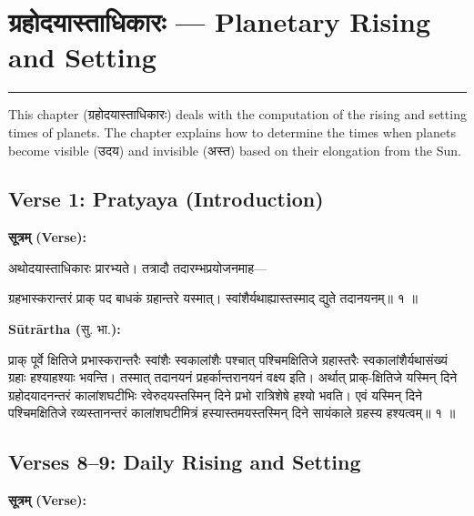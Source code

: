 \documentclass[11pt,a4paper]{article}
\newcommand{\dev}[1]{{\devanagarifont #1}}
\newcommand{\arth}{\textbf{Sūtrārtha (}\dev{सु. भा.}\textbf{):}\ }
\newenvironment{sanskritverse}{%
  \begin{center}\begin{minipage}{0.9\textwidth}
  \setlength{\leftskip}{1em}
  \setlength{\rightskip}{1em}
  \dev
}{\end{minipage}\end{center}}
\begin{document}
\section{\dev{ग्रहोदयास्ताधिकारः} — Planetary Rising and Setting}
\label{sec:grahodayasta}

\begin{center}
\textcolor{rulecolor}{\rule{0.8\textwidth}{0.5pt}}
\end{center}

This chapter (\dev{ग्रहोदयास्ताधिकारः}) deals with the computation of the rising
and setting times of planets. The chapter explains how to determine the times
when planets become visible (\dev{उदय}) and invisible (\dev{अस्त}) based on their
elongation from the Sun.

\subsection{Verse 1: Pratyaya (Introduction)}

\vspace{0.5em}
\noindent\textbf{\dev{सूत्रम् (Verse):}}
\begin{sanskritverse}
अथोदयास्ताधिकारः प्रारभ्यते। तत्रादौ तदारम्भप्रयोजनमाह—
\end{sanskritverse}

\begin{sanskritverse}
ग्रहभास्करान्तरं प्राक् पद बाधकं ग्रहान्तरे यस्मात्।
स्वांशैर्यथाह्यास्तस्माद् द्युते तदानयनम्॥ १ ॥
\end{sanskritverse}

\noindent\arth
\begin{sanskritverse}
प्राक् पूर्वे क्षितिजे प्रभास्करान्तरैः स्वांशैः स्वकालांशैः पश्चात् पश्चिमक्षितिजे
ग्रहास्तरैः स्वकालांशैर्यथासंख्यं ग्रहाः हश्याहश्याः भवन्ति। तस्मात् तदानयनं
प्रहर्कान्तरानयनं वक्ष्य इति। अर्थात् प्राक्-क्षितिजे यस्मिन् दिने ग्रहोदयादनन्तरं
कालांशघटीभिः रवेरुदयस्तस्मिन् दिने प्रभो रात्रिशेषे हश्यो भवति। एवं यस्मिन् दिने
पश्चिमक्षितिजे रव्यस्तानन्तरं कालांशघटीमित्रं हस्यास्तमयस्तस्मिन् दिने सायंकाले
ग्रहस्य हश्यत्वम्॥ १ ॥
\end{sanskritverse}

\subsection{Verses 8--9: Daily Rising and Setting}

\vspace{0.5em}
\noindent\textbf{\dev{सूत्रम् (Verse):}}
\end{document}
